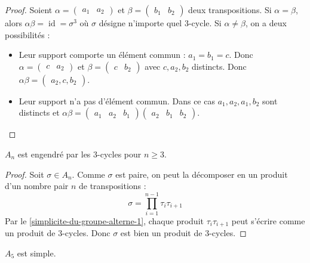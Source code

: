 	\begin{proof}
		Soient $\alpha = \begin{pmatrix} a_1 & a_2 \end{pmatrix}$ et $\beta = \begin{pmatrix} b_1 & b_2 \end{pmatrix}$ deux transpositions. Si $\alpha = \beta$, alors $\alpha\beta = \operatorname{id} = \sigma^3$ où $\sigma$ désigne n'importe quel $3$-cycle.
		\newpar
		Si $\alpha \neq \beta$, on a deux possibilités :
		\begin{itemize}
			\item Leur support comporte un élément commun : $a_1 = b_1 = c$. Donc $\alpha = \begin{pmatrix} c & a_2 \end{pmatrix}$ et $\beta = \begin{pmatrix} c & b_2 \end{pmatrix}$ avec $c, a_2, b_2$ distincts. Donc $\alpha\beta = \begin{pmatrix} a_2, c, b_2 \end{pmatrix}$.
			\item Leur support n'a pas d'élément commun. Dans ce cas $a_1, a_2, a_1, b_2$ sont distincts et $\alpha\beta = \begin{pmatrix} a_1 & a_2 & b_1 \end{pmatrix} \begin{pmatrix} a_2 & b_1 & b_2 \end{pmatrix}$.
		\end{itemize}
	\end{proof}

	\begin{lemma}
		\label{simplicite-du-groupe-alterne-3}
		$A_n$ est engendré par les $3$-cycles pour $n \geq 3$.
	\end{lemma}

	\begin{proof}
		Soit $\sigma \in A_n$. Comme $\sigma$ est paire, on peut la décomposer en un produit d'un nombre pair $n$ de transpositions :
		\[ \sigma = \prod_{i=1}^{n-1} \tau_i\tau_{i+1} \]
		Par le \cref{simplicite-du-groupe-alterne-1}, chaque produit $\tau_i\tau_{i+1}$ peut s'écrire comme un produit de $3$-cycles. Donc $\sigma$ est bien un produit de $3$-cycles.
	\end{proof}


	\begin{lemma}
		\label{simplicite-du-groupe-alterne-4}
		$A_5$ est simple.
	\end{lemma}

